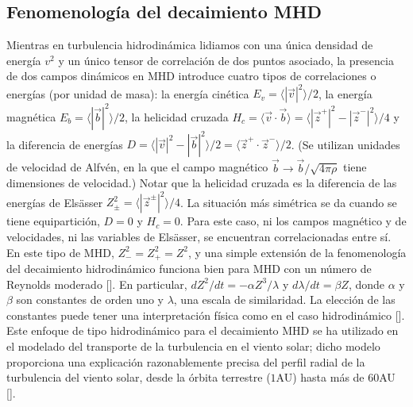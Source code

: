 \subsection{Fenomenología del decaimiento MHD}
Mientras en turbulencia hidrodinámica lidiamos con una única densidad
de energía $v^2$ y un único tensor de correlación de dos puntos
asociado, la presencia de dos campos dinámicos en MHD introduce cuatro
tipos de correlaciones o energías (por unidad de masa): la energía
cinética $E_v = \langle \left| \vec{v}\right|^2\rangle/2$, la energía
magnética $E_b = \langle \left| \vec{b}\right|^2\rangle/2$, la
helicidad cruzada $H_c = \langle \vec{v} \cdot \vec{b} \rangle =
\langle \left| \vec{z}^+\right|^2 - \left| \vec{z}^-\right|^2
\rangle/4$ y la diferencia de energías $D = \langle \left|
\vec{v}\right|^2 - \left| \vec{b} \right|^2 \rangle/2 = \langle
\vec{z}^+ \cdot \vec{z}^- \rangle/2$. (Se utilizan unidades de
velocidad de Alfvén, en la que el campo magnético $\vec{b} \rightarrow
\vec{b}/\sqrt{4\pi\rho}$ tiene dimensiones de velocidad.) Notar que la
helicidad cruzada es la diferencia de las energías de Els\"asser
$Z_\pm^2 = \langle \left| \vec{z}^\pm \right|^2 \rangle/4$. La
situación más simétrica se da cuando se tiene equipartición, $D = 0$ y
$H_c = 0$. Para este caso, ni los campos magnético y de velocidades,
ni las variables de Els\"asser, se encuentran correlacionadas entre
sí. En este tipo de MHD, $Z_-^2 = Z_+^2 = Z^2$, y una simple extensión
de la fenomenología del decaimiento hidrodinámico funciona bien para
MHD con un número de Reynolds moderado
[\cite{hossain_phenomenology_1995}]. En particular, $dZ^2/dt = -\alpha
Z^3/\lambda$ y $d\lambda/dt = \beta Z$, donde $\alpha$ y $\beta$ son
constantes de orden uno y $\lambda$, una escala de similaridad. La
elección de las constantes puede tener una interpretación física como
en el caso hidrodinámico [\cite{matthaeus_anisotropic_1996}]. Este
enfoque de tipo hidrodinámico para el decaimiento MHD se ha utilizado
en el modelado del transporte de la turbulencia en el viento solar;
dicho modelo proporciona una explicación razonablemente precisa del
perfil radial de la turbulencia del viento solar, desde la órbita
terrestre ($1$AU) hasta más de $60$AU [\cite{smith_heating_2001}].

